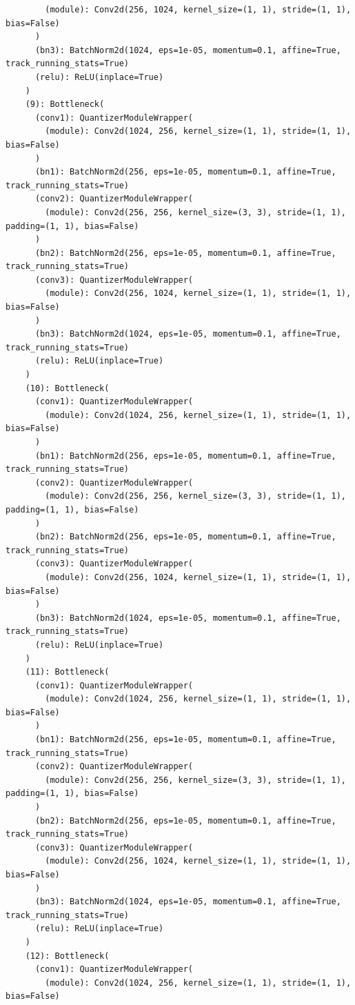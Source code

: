 \documentclass{article}
\begin{document}
\begin{verbatim}
        (module): Conv2d(256, 1024, kernel_size=(1, 1), stride=(1, 1), bias=False)
      )
      (bn3): BatchNorm2d(1024, eps=1e-05, momentum=0.1, affine=True, track_running_stats=True)
      (relu): ReLU(inplace=True)
    )
    (9): Bottleneck(
      (conv1): QuantizerModuleWrapper(
        (module): Conv2d(1024, 256, kernel_size=(1, 1), stride=(1, 1), bias=False)
      )
      (bn1): BatchNorm2d(256, eps=1e-05, momentum=0.1, affine=True, track_running_stats=True)
      (conv2): QuantizerModuleWrapper(
        (module): Conv2d(256, 256, kernel_size=(3, 3), stride=(1, 1), padding=(1, 1), bias=False)
      )
      (bn2): BatchNorm2d(256, eps=1e-05, momentum=0.1, affine=True, track_running_stats=True)
      (conv3): QuantizerModuleWrapper(
        (module): Conv2d(256, 1024, kernel_size=(1, 1), stride=(1, 1), bias=False)
      )
      (bn3): BatchNorm2d(1024, eps=1e-05, momentum=0.1, affine=True, track_running_stats=True)
      (relu): ReLU(inplace=True)
    )
    (10): Bottleneck(
      (conv1): QuantizerModuleWrapper(
        (module): Conv2d(1024, 256, kernel_size=(1, 1), stride=(1, 1), bias=False)
      )
      (bn1): BatchNorm2d(256, eps=1e-05, momentum=0.1, affine=True, track_running_stats=True)
      (conv2): QuantizerModuleWrapper(
        (module): Conv2d(256, 256, kernel_size=(3, 3), stride=(1, 1), padding=(1, 1), bias=False)
      )
      (bn2): BatchNorm2d(256, eps=1e-05, momentum=0.1, affine=True, track_running_stats=True)
      (conv3): QuantizerModuleWrapper(
        (module): Conv2d(256, 1024, kernel_size=(1, 1), stride=(1, 1), bias=False)
      )
      (bn3): BatchNorm2d(1024, eps=1e-05, momentum=0.1, affine=True, track_running_stats=True)
      (relu): ReLU(inplace=True)
    )
    (11): Bottleneck(
      (conv1): QuantizerModuleWrapper(
        (module): Conv2d(1024, 256, kernel_size=(1, 1), stride=(1, 1), bias=False)
      )
      (bn1): BatchNorm2d(256, eps=1e-05, momentum=0.1, affine=True, track_running_stats=True)
      (conv2): QuantizerModuleWrapper(
        (module): Conv2d(256, 256, kernel_size=(3, 3), stride=(1, 1), padding=(1, 1), bias=False)
      )
      (bn2): BatchNorm2d(256, eps=1e-05, momentum=0.1, affine=True, track_running_stats=True)
      (conv3): QuantizerModuleWrapper(
        (module): Conv2d(256, 1024, kernel_size=(1, 1), stride=(1, 1), bias=False)
      )
      (bn3): BatchNorm2d(1024, eps=1e-05, momentum=0.1, affine=True, track_running_stats=True)
      (relu): ReLU(inplace=True)
    )
    (12): Bottleneck(
      (conv1): QuantizerModuleWrapper(
        (module): Conv2d(1024, 256, kernel_size=(1, 1), stride=(1, 1), bias=False)

\end{verbatim}
\end{document}
